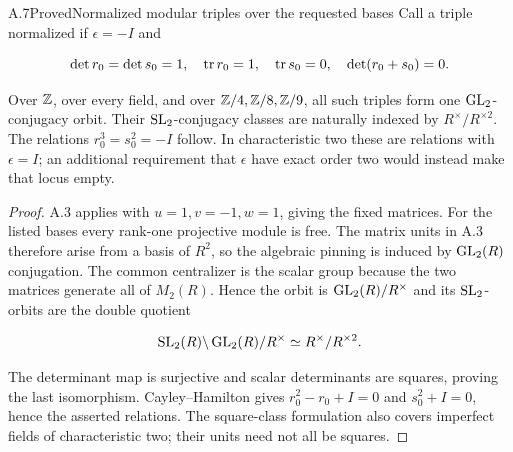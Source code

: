 \begin{statement}{A.7}{Proved}{Normalized modular triples over the requested bases}
Call a triple normalized if $\epsilon=-I$ and

$$
\det r_0=\det s_0=1,\quad
 \operatorname{tr} r_0=1,\quad\operatorname{tr} s_0=0,\quad
 \det(r_0+s_0)=0.
$$

Over $\mathbb Z$, over every field, and over $\mathbb Z/4,\mathbb Z/8,\mathbb Z/9$,
all such triples form one $\operatorname{GL}_2$-conjugacy orbit.
Their $\operatorname{SL}_2$-conjugacy classes are naturally indexed by
$R^\times/R^{\times2}$.
The relations $r_0^3=s_0^2=-I$ follow.
In characteristic two these are relations with $\epsilon=I$;
an additional requirement that $\epsilon$ have exact order two
would instead make that locus empty.
\end{statement}
\begin{proof}
A.3 applies with $u=1,v=-1,w=1$, giving the fixed matrices.
For the listed bases every rank-one projective module is free.
The matrix units in A.3 therefore arise from a basis of $R^2$,
so the algebraic pinning is induced by $\operatorname{GL}_2(R)$ conjugation.
The common centralizer is the scalar group because the two
matrices generate all of $M_2(R)$.
Hence the orbit is $\operatorname{GL}_2(R)/R^\times$ and its $\operatorname{SL}_2$-orbits
are the double quotient

$$
\operatorname{SL}_2(R)\backslash\operatorname{GL}_2(R)/R^\times
 \simeq R^\times/R^{\times2}.
$$

The determinant map is surjective and scalar determinants
are squares, proving the last isomorphism.
Cayley--Hamilton gives $r_0^2-r_0+I=0$ and $s_0^2+I=0$,
hence the asserted relations.
The square-class formulation also covers imperfect fields
of characteristic two; their units need not all be squares.
\end{proof}

